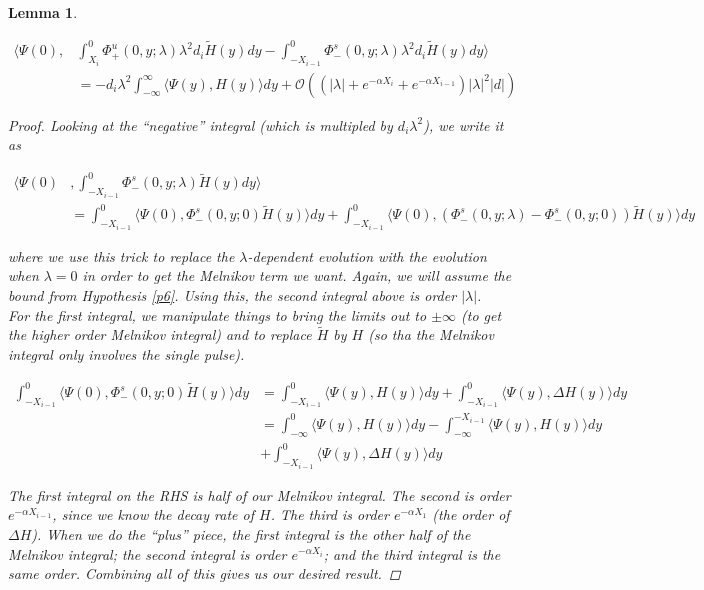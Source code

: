 \documentclass[12pt]{article}
\newtheorem{lemma}{Lemma}
\begin{document}
\begin{lemma}\label{noncenterH}

\begin{align*}
\langle \Psi(0), &\int_{X_i}^0 \Phi^u_+(0, y; \lambda) \lambda^2 d_i \tilde{H}(y) dy - \int_{-X_{i-1}}^0 \Phi^s_-(0, y; \lambda) \lambda^2 d_i \tilde{H}(y) dy \rangle \\ 
&= -d_i \lambda^2 \int_{-\infty}^\infty \langle \Psi(y), H(y) \rangle dy + \mathcal{O}( ( |\lambda| + e^{-\alpha X_i} + e^{-\alpha X_{i-1}} ) |\lambda|^2 |d|)
\end{align*}

\begin{proof}

Looking at the ``negative'' integral (which is multipled by $d_i \lambda^2$), we write it as

\begin{align*}
\langle \Psi(0)&, \int_{-X_{i-1}}^0 \Phi^s_-(0, y; \lambda) \tilde{H}(y) dy \rangle \\ 
&= \int_{-X_{i-1}}^0 \langle \Psi(0), \Phi^s_-(0, y; 0) \tilde{H}(y) \rangle dy + 
\int_{-X_{i-1}}^0 \langle \Psi(0), (\Phi^s_-(0, y; \lambda) - \Phi^s_-(0, y; 0)) \tilde{H}(y) \rangle dy
\end{align*}

where we use this trick to replace the $\lambda$-dependent evolution with the evolution when $\lambda = 0$ in order to get the Melnikov term we want. Again, we will assume the bound from Hypothesis \ref{p6}. Using this, the second integral above is order $|\lambda|$.\\

For the first integral, we manipulate things to bring the limits out to $\pm \infty$ (to get the higher order Melnikov integral) and to replace $\tilde{H}$ by $H$ (so tha the Melnikov integral only involves the single pulse).

\begin{align*}
\int_{-X_{i-1}}^0 \langle \Psi(0), \Phi^s_-(0, y; 0) \tilde{H}(y) \rangle dy &= 
\int_{-X_{i-1}}^0 \langle \Psi(y), H(y) \rangle dy + \int_{-X_{i-1}}^0 \langle \Psi(y), \Delta H(y) \rangle dy \\
&= \int_{-\infty}^0 \langle \Psi(y), H(y) \rangle dy - \int_{-\infty}^{-X_{i-1}} \langle \Psi(y), H(y) \rangle dy \\
&+ \int_{-X_{i-1}}^0 \langle \Psi(y), \Delta H(y) \rangle dy 
\end{align*}

The first integral on the RHS is half of our Melnikov integral. The second is order $e^{-\alpha X_{i-1}}$, since we know the decay rate of $H$. The third is order $e^{-\alpha X_1}$ (the order of $\Delta H$). When we do the ``plus'' piece, the first integral is the other half of the Melnikov integral; the second integral is order $e^{-\alpha X_i}$; and the third integral is the same order. Combining all of this gives us our desired result.
\end{proof}

\end{lemma}
\end{document}
